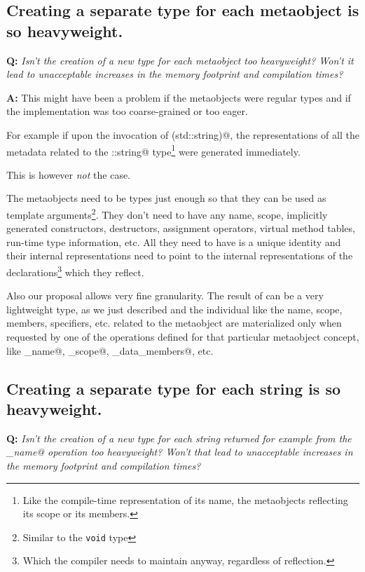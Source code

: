 \subsection{Creating a separate type for each metaobject is so heavyweight.}

\textbf{Q:} {\em Isn't the creation of a new type for each metaobject too
heavyweight? Won't it lead to unacceptable increases in the memory footprint
and compilation times?}

\textbf{A:} This might have been a problem if the metaobjects were regular
types and if the implementation was too coarse-grained or too eager.

For example if upon the invocation of \verb@reflexpr(std::string)@, the representations
of all the metadata related to the \verb@std::string@ type\footnote{Like
the compile-time representation of its name, the metaobjects reflecting its scope
or its members.} were generated immediately.

This is however {\em not} the case.

The metaobjects need to be types just enough so that they can be used
as template arguments\footnote{Similar to the \texttt{void} type}.
They don't need to have any name, scope, implicitly generated constructors,
destructors, assignment operators, virtual method tables, run-time type information,
etc. All they need to have is a unique identity and their internal representations
need to point to the internal representations of the declarations\footnote
{Which the compiler needs to maintain anyway, regardless of reflection.}
which they reflect.

Also our proposal allows very fine granularity. The result of \verb@reflexpr@
can be a very lightweight type, as we just described and the individual
 like the name, scope, members, specifiers, etc. related
to the metaobject are materialized only when requested by one of the operations
defined for that particular metaobject concept, like \verb@get_name@,
\verb@get_scope@, \verb@get_data_members@, etc.

\subsection{Creating a separate type for each string is so heavyweight.}

\textbf{Q:} {\em Isn't the creation of a new type for each string returned
for example from the \verb@get_name@ operation too heavyweight?
Won't that lead to unacceptable increases in the memory footprint
and compilation times?}

